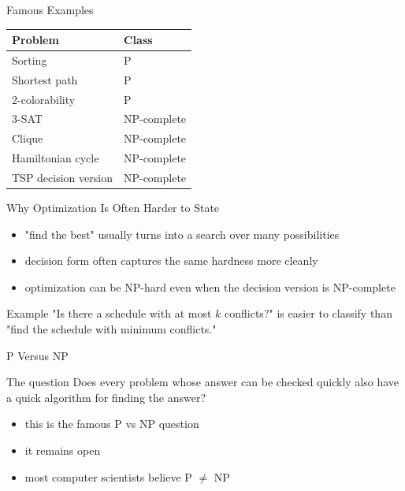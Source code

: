 \documentclass[aspectratio=169,xcolor=dvipsnames]{beamer}
\begin{document}
\begin{frame}{Famous Examples}
  \begin{center}
  \begin{tabular}{ll}
    \toprule
    Problem & Class \\
    \midrule
    Sorting & P \\
    Shortest path & P \\
    2-colorability & P \\
    3-SAT & NP-complete \\
    Clique & NP-complete \\
    Hamiltonian cycle & NP-complete \\
    TSP decision version & NP-complete \\
    \bottomrule
  \end{tabular}
  \end{center}
\end{frame}

\begin{frame}{Why Optimization Is Often Harder to State}
  \begin{itemize}
    \item "find the best" usually turns into a search over many possibilities
    \item decision form often captures the same hardness more cleanly
    \item optimization can be NP-hard even when the decision version is NP-complete
  \end{itemize}
  \begin{exampleblock}{Example}
    "Is there a schedule with at most $k$ conflicts?" is easier to classify than "find the schedule with minimum conflicts."
  \end{exampleblock}
\end{frame}

\begin{frame}{P Versus NP}
  \begin{alertblock}{The question}
    Does every problem whose answer can be checked quickly also have a quick algorithm for finding the answer?
  \end{alertblock}
  \begin{itemize}
    \item this is the famous P vs NP question
    \item it remains open
    \item most computer scientists believe P $\ne$ NP
  \end{itemize}
\end{frame}
\end{document}

